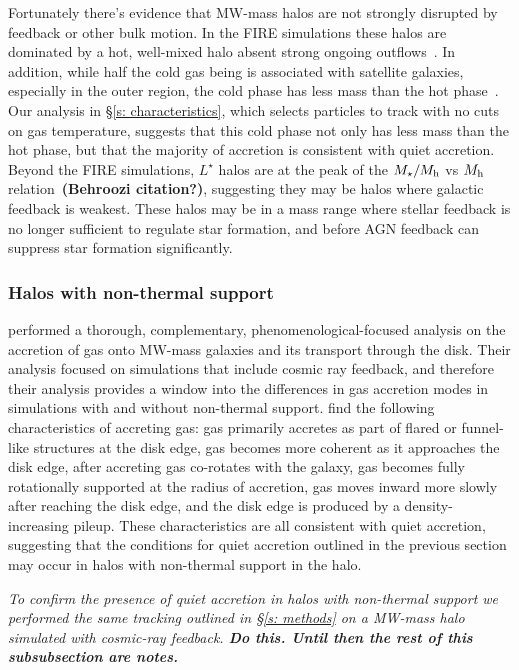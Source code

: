 \documentclass[fleqn,usenatbib]{mnras}
\begin{document}
Fortunately there's evidence that MW-mass halos are not strongly disrupted by feedback or other bulk motion.
In the FIRE simulations these halos are dominated by a hot, well-mixed halo absent strong ongoing outflows~\citep{Hafen2019}.
In addition, while half the cold gas being is associated with satellite galaxies, especially in the outer region, the cold phase has less mass than the hot phase~\citep{Hafen2020}.
Our analysis in \S\ref{s: characteristics}, which selects particles to track with no cuts on gas temperature, suggests that this cold phase not only has less mass than the hot phase, but that the majority of accretion is consistent with quiet accretion.
Beyond the FIRE simulations, $L^\star$ halos are at the peak of the $M_\star/M_{\rm h}$ vs $M_{\rm h}$ relation~\textbf{(Behroozi citation?)}, suggesting they may be halos where galactic feedback is weakest.
These halos may be in a mass range where stellar feedback is no longer sufficient to regulate star formation, and before AGN feedback can suppress star formation significantly.

\subsubsection{Halos with non-thermal support}
\label{s: broader prevalance -- non-thermal}

\cite{Trapp2021} performed a thorough, complementary, phenomenological-focused analysis on the accretion of gas onto MW-mass galaxies and its transport through the disk.
Their analysis focused on simulations that include cosmic ray feedback, and therefore their analysis provides a window into the differences in gas accretion modes in simulations with and without non-thermal support.
\citeauthor{Trapp2021} find the following characteristics of accreting gas:
gas primarily accretes as part of flared or funnel-like structures at the disk edge,
gas becomes more coherent as it approaches the disk edge,
after accreting gas co-rotates with the galaxy,
gas becomes fully rotationally supported at the radius of accretion,
gas moves inward more slowly after reaching the disk edge,
and the disk edge is produced by a density-increasing pileup.
These characteristics are all consistent with quiet accretion, suggesting that the conditions for quiet accretion outlined in the previous section may occur in halos with non-thermal support in the halo.

\textit{
To confirm the presence of quiet accretion in halos with non-thermal support we performed the same tracking outlined in \S\ref{s: methods} on a MW-mass halo simulated with cosmic-ray feedback.
\textbf{Do this. Until then the rest of this subsubsection are notes.}
}
\end{document}
